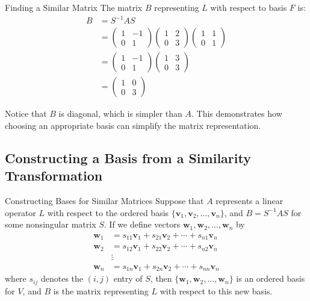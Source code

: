 \documentclass[12pt,a4paper]{article}
\newcommand{\vv}[1]{\mathbf{#1}}
\begin{document}
\begin{example}{Finding a Similar Matrix}
		The matrix $B$ representing $L$ with respect to basis $F$ is:
		\begin{align*}
			B &= S^{-1}AS \\
			&= \begin{pmatrix} 1 & -1 \\ 0 & 1 \end{pmatrix} \begin{pmatrix} 1 & 2 \\ 0 & 3 \end{pmatrix} \begin{pmatrix} 1 & 1 \\ 0 & 1 \end{pmatrix} \\
			&= \begin{pmatrix} 1 & -1 \\ 0 & 1 \end{pmatrix} \begin{pmatrix} 1 & 3 \\ 0 & 3 \end{pmatrix} \\
			&= \begin{pmatrix} 1 & 0 \\ 0 & 3 \end{pmatrix}
		\end{align*}
		
		Notice that $B$ is diagonal, which is simpler than $A$. This demonstrates how choosing an appropriate basis can simplify the matrix representation.
	\end{example}
	
	\subsection{Constructing a Basis from a Similarity Transformation}
	
	\begin{proposition}{Constructing Bases for Similar Matrices}
		Suppose that $A$ represents a linear operator $L$ with respect to the ordered basis $\{\vv{v}_1, \vv{v}_2, \ldots, \vv{v}_n\}$, and $B = S^{-1}AS$ for some nonsingular matrix $S$. If we define vectors $\vv{w}_1, \vv{w}_2, \ldots, \vv{w}_n$ by
		\begin{align*}
			\vv{w}_1 &= s_{11}\vv{v}_1 + s_{21}\vv{v}_2 + \cdots + s_{n1}\vv{v}_n \\
			\vv{w}_2 &= s_{12}\vv{v}_1 + s_{22}\vv{v}_2 + \cdots + s_{n2}\vv{v}_n \\
			&\vdots \\
			\vv{w}_n &= s_{1n}\vv{v}_1 + s_{2n}\vv{v}_2 + \cdots + s_{nn}\vv{v}_n
		\end{align*}
		where $s_{ij}$ denotes the $(i,j)$ entry of $S$, then $\{\vv{w}_1, \vv{w}_2, \ldots, \vv{w}_n\}$ is an ordered basis for $V$, and $B$ is the matrix representing $L$ with respect to this new basis.
	\end{proposition}
	
\end{document}
